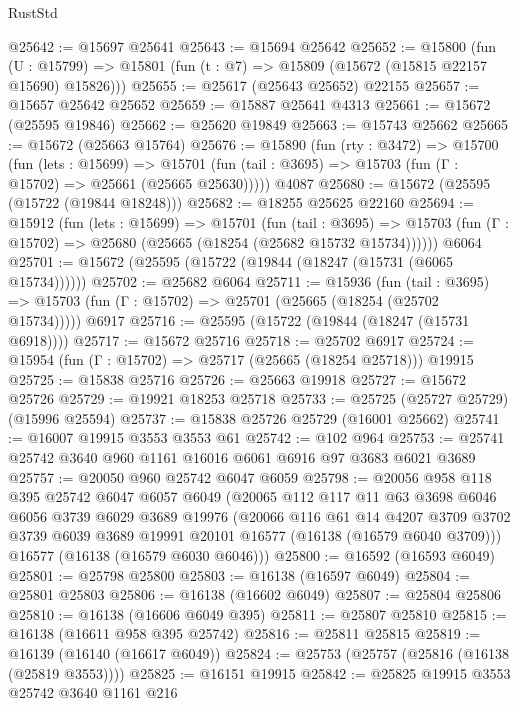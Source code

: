 \begin{lexlean}{RustStd}
\begin{coremodule}
@25642 := @15697 @25641
@25643 := @15694 @25642
@25652 := @15800
    (fun (U : @15799) => @15801 (fun (t : @7) => @15809 (@15672 (@15815 @22157 @15690) @15826)))
@25655 := @25617 (@25643 @25652) @22155
@25657 := @15657 @25642 @25652
@25659 := @15887 @25641 @4313
@25661 := @15672 (@25595 @19846)
@25662 := @25620 @19849
@25663 := @15743 @25662
@25665 := @15672 (@25663 @15764)
@25676 := @15890
    (fun (rty : @3472) =>
    @15700
      (fun (lets : @15699) =>
      @15701 (fun (tail : @3695) => @15703 (fun (Γ : @15702) => @25661 (@25665 @25630)))))
    @4087
@25680 := @15672 (@25595 (@15722 (@19844 @18248)))
@25682 := @18255 @25625 @22160
@25694 := @15912
    (fun (lets : @15699) =>
    @15701
      (fun (tail : @3695) =>
      @15703 (fun (Γ : @15702) => @25680 (@25665 (@18254 (@25682 @15732 @15734))))))
    @6064
@25701 := @15672 (@25595 (@15722 (@19844 (@18247 (@15731 (@6065 @15734))))))
@25702 := @25682 @6064
@25711 := @15936
    (fun (tail : @3695) => @15703 (fun (Γ : @15702) => @25701 (@25665 (@18254 (@25702 @15734)))))
    @6917
@25716 := @25595 (@15722 (@19844 (@18247 (@15731 @6918))))
@25717 := @15672 @25716
@25718 := @25702 @6917
@25724 := @15954 (fun (Γ : @15702) => @25717 (@25665 (@18254 @25718))) @19915
@25725 := @15838 @25716
@25726 := @25663 @19918
@25727 := @15672 @25726
@25729 := @19921 @18253 @25718
@25733 := @25725 (@25727 @25729) (@15996 @25594)
@25737 := @15838 @25726 @25729 (@16001 @25662)
@25741 := @16007 @19915 @3553 @3553 @61
@25742 := @102 @964
@25753 := @25741 @25742 @3640 @960 @1161 @16016 @6061 @6916 @97 @3683 @6021 @3689
@25757 := @20050 @960 @25742 @6047 @6059
@25798 := @20056
    @958
    @118
    @395
    @25742
    @6047
    @6057
    @6049
    (@20065
      @112
      @117
      @11
      @63
      @3698
      @6046
      @6056
      @3739
      @6029
      @3689
      @19976
      (@20066
        @116
        @61
        @14
        @4207
        @3709
        @3702
        @3739
        @6039
        @3689
        @19991
        @20101
        @16577
        (@16138 (@16579 @6040 @3709)))
      @16577
      (@16138 (@16579 @6030 @6046)))
@25800 := @16592 (@16593 @6049)
@25801 := @25798 @25800
@25803 := @16138 (@16597 @6049)
@25804 := @25801 @25803
@25806 := @16138 (@16602 @6049)
@25807 := @25804 @25806
@25810 := @16138 (@16606 @6049 @395)
@25811 := @25807 @25810
@25815 := @16138 (@16611 @958 @395 @25742)
@25816 := @25811 @25815
@25819 := @16139 (@16140 (@16617 @6049))
@25824 := @25753 (@25757 (@25816 (@16138 (@25819 @3553))))
@25825 := @16151 @19915
@25842 := @25825
    @19915
    @3553
    @25742
    @3640
    @1161
    @216

\end{coremodule}
\end{lexlean}
